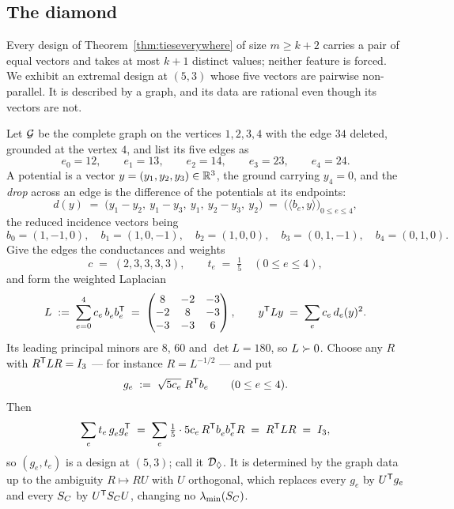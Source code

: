 \subsection{The diamond}\label{sec:diamond}

Every design of Theorem~\ref{thm:tieseverywhere} of size $m\ge k+2$
carries a pair of equal vectors and takes at most $k+1$ distinct
values; neither feature is forced.  We exhibit an extremal design at
$(5,3)$ whose five vectors are pairwise non-parallel.  It is described
by a graph, and its data are rational even though its vectors are not.

Let $\mathcal{G}$ be the complete graph on the vertices $1,2,3,4$ with the edge
$34$ deleted, grounded at the vertex $4$, and list its five edges as
\[
  e_0=12,\qquad e_1=13,\qquad e_2=14,\qquad e_3=23,\qquad e_4=24 .
\]
A potential is a vector $y=(y_1,y_2,y_3)\in\mathbb{R}^3$, the ground carrying
$y_4=0$, and the \emph{drop} across an edge is the difference of the
potentials at its endpoints:
\begin{equation}\label{eq:drops}
  d(y)\;=\;\bigl(y_1-y_2,\ y_1-y_3,\ y_1,\ y_2-y_3,\ y_2\bigr)
  \;=\;\bigl(\langle b_e,y\rangle\bigr)_{0\le e\le4},
\end{equation}
the reduced incidence vectors being
\[
  b_0=(1,-1,0),\quad b_1=(1,0,-1),\quad b_2=(1,0,0),\quad
  b_3=(0,1,-1),\quad b_4=(0,1,0).
\]
Give the edges the conductances and weights
\[
  c\;=\;(2,3,3,3,3), \qquad t_e\;=\;\tfrac15\quad(0\le e\le4),
\]
and form the weighted Laplacian
\begin{equation}\label{eq:laplacian}
  L\;:=\;\sum_{e=0}^{4}c_e\,b_e^{\vphantom{\mathsf{T}}}b_e\tp
  \;=\;\begin{pmatrix} 8&-2&-3\\ -2&8&-3\\ -3&-3&6\end{pmatrix},
  \qquad
  y\tp Ly\;=\;\sum_{e}c_e\,d_e(y)^{2}.
\end{equation}
Its leading principal minors are $8$, $60$ and $\det L=180$, so $L\succ0$.
Choose any $R$ with $R^{\mathsf{T}} LR=I_3$ --- for instance $R=L^{-1/2}$ --- and
put
\begin{equation}\label{eq:diamondatoms}
  g_e\;:=\;\sqrt{5c_e}\;R^{\mathsf{T}} b_e \qquad (0\le e\le 4).
\end{equation}
Then
\[
  \sum_{e}t_e\,g_e^{\vphantom{\mathsf{T}}}g_e\tp
  \;=\;\sum_e \tfrac15\cdot 5c_e\,R\tp b_e^{\vphantom{\mathsf{T}}}b_e\tp R
  \;=\;R\tp LR\;=\;I_3,
\]
so $(g_e,t_e)$ is a design at $(5,3)$; call it $\mathcal{D}_{\Diamond}$.  It is
determined by the graph data up to the ambiguity $R\mapsto RU$ with $U$
orthogonal, which replaces every $g_e$ by $U^{\mathsf{T}} g_e$ and every $S_{C}$ by
$U^{\mathsf{T}}S_{C} U$, changing no $\lambda_{\min}(S_{C})$.

